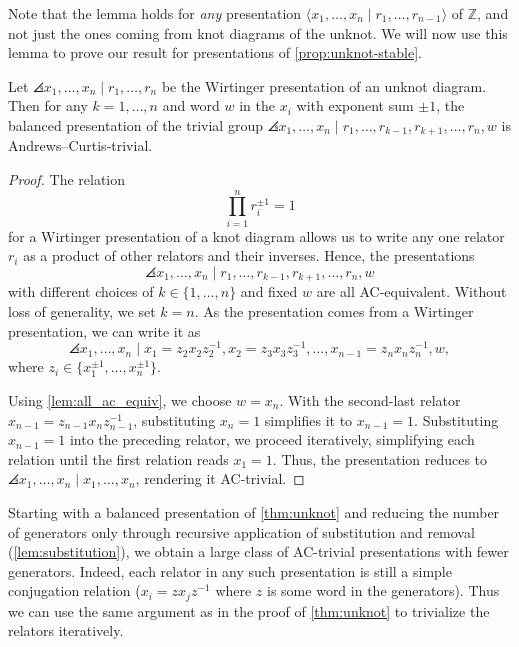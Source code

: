 Note that the lemma holds for \emph{any} presentation $\langle x_1,\ldots, x_n \mid r_1,\ldots,r_{n-1}\rangle$ of $\mathbb{Z}$, and not just the ones coming from knot diagrams of the unknot. We will now use this lemma to prove our result for presentations of \cref{prop:unknot-stable}.

\begin{theorem} \label{thm:unknot}
    Let $\angles{ x_1,\ldots, x_n \mid r_1, \ldots, r_n }$ be the Wirtinger presentation of an unknot diagram. Then for any $k=1,\ldots,n$ and word $w$ in the $x_i$ with exponent sum $\pm 1$, the balanced presentation of the trivial group $\angles{ x_1,\ldots, x_n \mid r_1,\ldots, r_{k-1}, r_{k+1},\ldots, r_n, w}$ is Andrews--Curtis-trivial.
\end{theorem}

\begin{proof}
The relation  $$\prod\limits_{i=1}^nr_i^{\pm1}=1$$ for a Wirtinger presentation of a knot diagram allows us to write any one relator $r_i$ as a product of other relators and their inverses. Hence, the presentations 
$$\angles{x_1, \ldots, x_n \mid r_1, \ldots, r_{k-1}, r_{k+1}, \ldots, r_n, w}$$ with different choices of $k \in \{1, \ldots, n\}$ and fixed $w$ are all AC-equivalent. Without loss of generality, we set $k=n$. As the presentation comes from a Wirtinger presentation, we can write it as 
\[
\angles{ x_1,\ldots,x_n \mid x_1=z_2x_2z_2^{-1}, x_2=z_3x_3z_3^{-1},\ldots, x_{n-1}=z_{n}x_nz_{n}^{-1}, w },
\]
where $z_i\in \{x_1^{\pm 1},\ldots, x_n^{\pm 1}\}$. 

Using \cref{lem:all_ac_equiv}, we choose $w = x_n$. 
With the second-last relator \( x_{n-1} = z_{n-1} x_n z_{n-1}^{-1} \), substituting \( x_n = 1 \) simplifies it to \( x_{n-1} = 1 \). Substituting \( x_{n-1} = 1 \) into the preceding relator, we proceed iteratively, simplifying each relation until the first relation reads \( x_1 = 1 \). 
Thus, the presentation reduces to  $\angles{x_1, \ldots, x_n \mid x_1, \ldots, x_n}$,
rendering it AC-trivial. 

\end{proof}
\begin{remark}
\label{rem:sub+rem}
    Starting with a balanced presentation of \cref{thm:unknot} and reducing the number of generators only through recursive application of substitution and removal (\cref{lem:substitution}), we obtain a large class of AC-trivial presentations with fewer generators. Indeed, each relator in any such presentation is still a simple conjugation relation ($x_i=zx_jz^{-1}$ where $z$ is some word in the generators). Thus we can use the same argument as in the proof of \cref{thm:unknot} to trivialize the relators iteratively. 
\end{remark}

